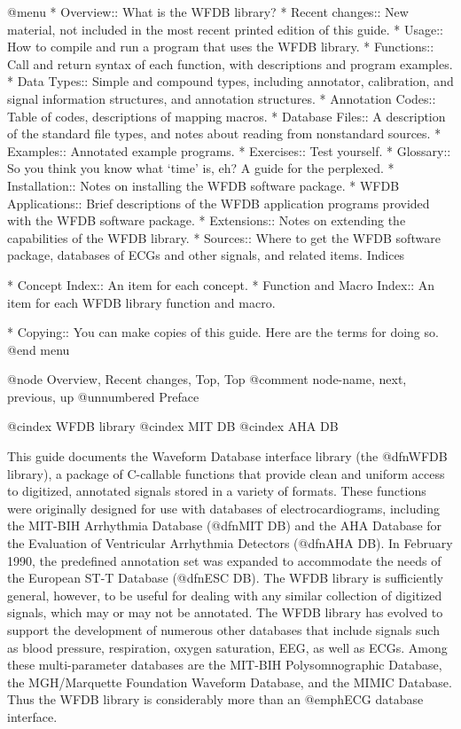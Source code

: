 @menu
* Overview::			What is the WFDB library?
* Recent changes::              New material, not included in the most
                                recent printed edition of this guide.
* Usage::			How to compile and run a program that uses
				the WFDB library.
* Functions::			Call and return syntax of each function, with
				descriptions and program examples.
* Data Types::		        Simple and compound types, including annotator,
				calibration, and signal information structures,
				and annotation structures.
* Annotation Codes::    	Table of codes, descriptions of mapping macros.
* Database Files::		A description of the standard file types, and
				notes about reading from nonstandard sources.
* Examples::			Annotated example programs.
* Exercises::			Test yourself.
* Glossary::			So you think you know what `time' is, eh?
				A guide for the perplexed.
* Installation::		Notes on installing the WFDB software package.
* WFDB Applications::		Brief descriptions of the WFDB application
				programs provided with the WFDB software package.
* Extensions::			Notes on extending the capabilities of the
				WFDB library.
* Sources::			Where to get the WFDB software package, databases
				of ECGs and other signals, and related items.
Indices

* Concept Index::		An item for each concept.
* Function and Macro Index::	An item for each WFDB library function and macro.

* Copying::                     You can make copies of this guide.  Here are
                                the terms for doing so.
@end menu

@node     Overview, Recent changes, Top, Top
@comment  node-name,  next,  previous,  up
@unnumbered Preface

@cindex WFDB library
@cindex MIT DB
@cindex AHA DB

This guide documents the Waveform Database interface library (the
@dfn{WFDB library}), a package of C-callable functions that provide
clean and uniform access to digitized, annotated signals stored in a
variety of formats.  These functions were originally designed for use
with databases of electrocardiograms, including the MIT-BIH Arrhythmia
Database (@dfn{MIT DB}) and the AHA Database for the Evaluation of
Ventricular Arrhythmia Detectors (@dfn{AHA DB}).  In February 1990, the
predefined annotation set was expanded to accommodate the needs of the
European ST-T Database (@dfn{ESC DB}).  The WFDB library is sufficiently
general, however, to be useful for dealing with any similar collection
of digitized signals, which may or may not be annotated.  The WFDB
library has evolved to support the development of numerous other
databases that include signals such as blood pressure, respiration,
oxygen saturation, EEG, as well as ECGs.  Among these multi-parameter
databases are the MIT-BIH Polysomnographic Database, the MGH/Marquette
Foundation Waveform Database, and the MIMIC Database.  Thus the WFDB
library is considerably more than an @emph{ECG} database interface.

